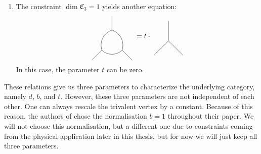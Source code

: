 \begin{enumerate}
\begin{equation}
\begin{tikzpicture}[scale=1.1,baseline=(current bounding box.center)]
					 	\draw (0,-0.1) -- (0,0.3);
					 	\draw (0,0.3) to [bend left=60] (0,1.2);
					 	\draw (0,0.3) to [bend right=60] (0,1.2);
					 	\draw (0,1.2) -- (0,1.6);
				 	\end{tikzpicture}\ =\ b\cdot\ 
				 	\begin{tikzpicture}[scale=1.1,baseline=(current bounding box.center)]
				 		\draw (0,-0.1) -- (0,1.6);
				 	\end{tikzpicture}
			 	\end{equation}
			 where the parameter $b$ is again non-zero, because the diagram on the left hand side of the equation has to be non-zero with the same argument as above.
			 \item The constraint $\dim\mathfrak{C}_3=1$ yields another equation:
			 	\begin{equation}
			 	\label{eq:triangle}
				 	\begin{tikzpicture}[baseline=(current bounding box.center)]
					 	\draw (0.5,1) -- (0.5,1.7);
					 	\draw (0.5,1) to [bend right=45] (0,0);
					 	\draw (0.5,1) to [bend left=45] (1,0);
					 	\draw (0,0) to [bend right=45] (1,0);
					 	\draw (0,0) -- ++(225:0.7cm);
					 	\draw (1,0) -- ++(315:0.7cm);
				 	\end{tikzpicture}\ = t\cdot\ 
				 	\begin{tikzpicture}[baseline=(current bounding box.center)]
					 	\draw (0,0) -- (90:1cm);
					 	\draw (0,0) -- (225:1cm);
					 	\draw (0,0) -- (315:1cm);
				 	\end{tikzpicture}
			 	\end{equation}
			 In this case, the parameter $t$ can be zero.
		\end{enumerate}
	These relations give us three parameters to characterize the underlying category, namely $d$, $b$, and $t$. However, these three parameters are not independent of each other. One can always rescale the trivalent vertex by a constant. Because of this reason, the authors of \cite{Morrison2017} chose the normalisation $b=1$ throughout their paper. We will not choose this normalisation, but a different one due to constraints coming from the physical application later in this thesis, but for now we will just keep all three parameters.
	
